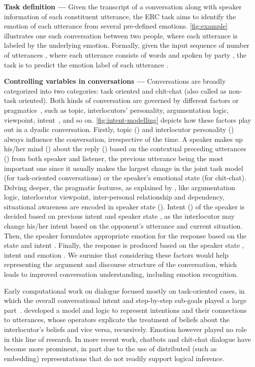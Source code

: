 \documentclass{IEEEtran}\usepackage[pdftex]{graphicx}
\begin{document}
	\textbf{Task definition --- }Given the transcript of a conversation along with speaker information
	of each constituent utterance, the ERC task aims to identify the emotion of each utterance from 
	several pre-defined emotions. \cref{fig:example} illustrates one such
	conversation between two people, where each utterance is labeled by the
	underlying emotion. Formally, given the input sequence of  number of
	utterances , where each utterance  consists of  words  and spoken by
	party , the task is to predict the emotion label  of
	each utterance .
	
	\textbf{Controlling variables in conversations ---} Conversations are broadly categorized into two categories: task oriented and chit-chat (also called as non-task oriented). Both kinds of conversation are governed by different factors or pragmatics~\cite{hovy1987generating}, such as topic, interlocutors' personality, argumentation logic, viewpoint, intent~\citep{schloder2015clarifying}, and so on. \cref{fig:intent-modelling} depicts how these factors play out in a dyadic conversation. Firstly, topic () and interlocutor personality () always influence the conversation, irrespective of the time. A speaker makes up his/her mind () about the reply () based on the contextual preceding utterances () from both speaker and listener, the previous utterance being the most important one since it usually makes the largest change in the joint task model (for task-oriented conversations) or the speaker's emotional state (for chit-chat). Delving deeper, the pragmatic features, as explained by \citet{hovy1987generating}, like argumentation logic, interlocutor viewpoint, inter-personal relationship and dependency, situational awareness are encoded in speaker state (). Intent () of the speaker is decided based on previous intent  and speaker state , as the interlocutor may change his/her intent based on the opponent's utterance and current situation. Then, the speaker formulates appropriate emotion  for the response based on the state  and intent . Finally, the response  is produced based on the speaker state , intent  and emotion . We surmise that considering these factors would help representing the argument and discourse structure of the conversation, which leads to improved conversation understanding, including emotion recognition. 
	
	Early computational work on dialogue focused mostly on task-oriented cases, in which the overall conversational intent and step-by-step sub-goals played a large part~\citep{grosz1986attention,appelt1992planning}. \citet{cohen1985speech} developed a model and logic to represent intentions and their connections to utterances, whose operators explicate the treatment of beliefs about the interlocutor’s beliefs and vice versa, recursively.  Emotion however played no role in this line of research.  In more recent work, chatbots and chit-chat dialogue have become more prominent, in part due to the use of distributed (such as embedding) representations that do not readily support logical inference.
	
\end{document}
